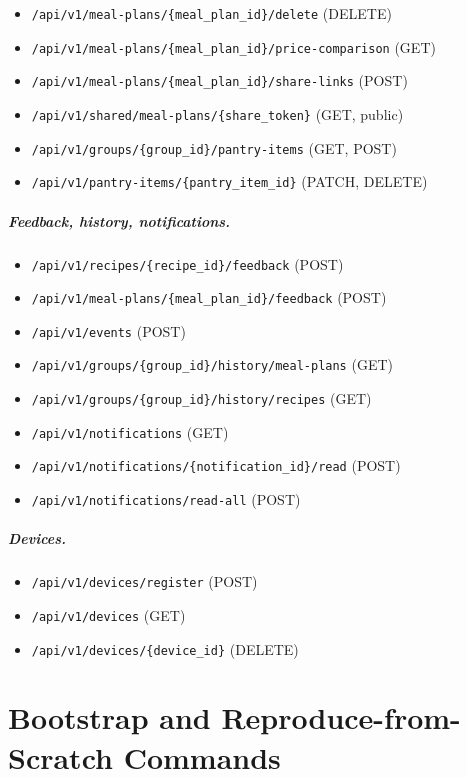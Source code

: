 \begin{itemize}
\item \texttt{/api/v1/meal-plans/\{meal\_plan\_id\}/delete} (DELETE)
\item \texttt{/api/v1/meal-plans/\{meal\_plan\_id\}/price-comparison} (GET)
\item \texttt{/api/v1/meal-plans/\{meal\_plan\_id\}/share-links} (POST)
\item \texttt{/api/v1/shared/meal-plans/\{share\_token\}} (GET, public)
\item \texttt{/api/v1/groups/\{group\_id\}/pantry-items} (GET, POST)
\item \texttt{/api/v1/pantry-items/\{pantry\_item\_id\}} (PATCH, DELETE)
\end{itemize}

\paragraph{Feedback, history, notifications.}
\begin{itemize}
\item \texttt{/api/v1/recipes/\{recipe\_id\}/feedback} (POST)
\item \texttt{/api/v1/meal-plans/\{meal\_plan\_id\}/feedback} (POST)
\item \texttt{/api/v1/events} (POST)
\item \texttt{/api/v1/groups/\{group\_id\}/history/meal-plans} (GET)
\item \texttt{/api/v1/groups/\{group\_id\}/history/recipes} (GET)
\item \texttt{/api/v1/notifications} (GET)
\item \texttt{/api/v1/notifications/\{notification\_id\}/read} (POST)
\item \texttt{/api/v1/notifications/read-all} (POST)
\end{itemize}

\paragraph{Devices.}
\begin{itemize}
\item \texttt{/api/v1/devices/register} (POST)
\item \texttt{/api/v1/devices} (GET)
\item \texttt{/api/v1/devices/\{device\_id\}} (DELETE)
\end{itemize}

\clearpage


\chapter{Bootstrap and Reproduce-from-Scratch Commands}
\label{app:bootstrap}

